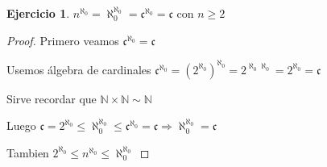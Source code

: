 \documentclass[12pt]{article}
\newcommand{\n}{\aleph_{0}}
\newcommand{\N}{\mathbb{N}}
\newcommand{\Ra}{\Rightarrow}
\theoremstyle{definition}
\newtheorem{ej}{Ejercicio}
\begin{document}
\noindent
\begin{ej} $n^{\n} = \n^{\n} = \mathfrak{c}^{\n} = \mathfrak{c}$ con $n \geq 2$

\begin{proof}
  Primero veamos $\mathfrak{c}^{\n} = \mathfrak{c}$

  Usemos álgebra de cardinales $\mathfrak{c}^{\n} = (2^{\n})^{\n} = 2^{\n \n} = 2^{\n} = \mathfrak{c} \quad $ 

  Sirve recordar que $\N \times \N \sim \N$

  Luego $\mathfrak{c}  = 2^{\n} \leq \n^{\n} \leq \mathfrak{c}^{\n} = \mathfrak{c} \Ra \n^{\n} = \mathfrak{c}$

  Tambien $2^{\n} \leq n^{\n} \leq \n^{\n}$
\end{proof}
\end{ej}
\end{document}

